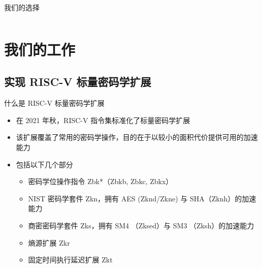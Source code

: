 \documentclass[aspectratio=169]{ctexbeamer}
\begin{document}
\begin{frame}{我们的选择}
\begin{columns}
\begin{column}{0.5\textwidth}
\begin{center}
      \end{center}
    \end{column}
  \end{columns}
\end{frame}

\section{我们的工作}

\subsection{实现 RISC-V 标量密码学扩展} %

\begin{frame}{什么是 RISC-V 标量密码学扩展}
  \begin{itemize}
    \item 在 2021 年秋，RISC-V 指令集标准化了标量密码学扩展
    \item 该扩展覆盖了常用的密码学操作，目的在于以较小的面积代价提供可用的加速能力
    \item<2-> 包括以下几个部分\begin{itemize}
      \item 密码学位操作指令 Zbk*（Zbkb, Zbkc, Zbkx）
      \item NIST 密码学套件 Zkn，拥有 AES (Zknd/Zkne) 与 SHA（Zknh）的加速能力
      \item 商密密码学套件 Zks，拥有 SM4 （Zksed）与 SM3 （Zksh）的加速能力
      \item 熵源扩展 Zkr
      \item 固定时间执行延迟扩展 Zkt
    \end{itemize}
  \end{itemize}
\end{frame}
\end{document}
